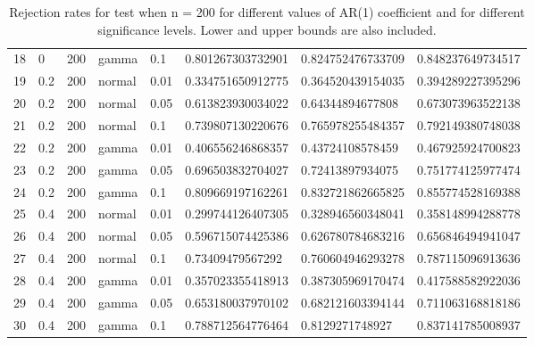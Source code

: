 \begin{table}[ht]
\begin{tabular}{rlllllll}
  18 & 0 & 200 & gamma & 0.1 & 0.801267303732901 & 0.824752476733709 & 0.848237649734517 \\ 
  19 & 0.2 & 200 & normal & 0.01 & 0.334751650912775 & 0.364520439154035 & 0.394289227395296 \\ 
  20 & 0.2 & 200 & normal & 0.05 & 0.613823930034022 & 0.64344894677808 & 0.673073963522138 \\ 
  21 & 0.2 & 200 & normal & 0.1 & 0.739807130220676 & 0.765978255484357 & 0.792149380748038 \\ 
  22 & 0.2 & 200 & gamma & 0.01 & 0.406556246868357 & 0.43724108578459 & 0.467925924700823 \\ 
  23 & 0.2 & 200 & gamma & 0.05 & 0.696503832704027 & 0.72413897934075 & 0.751774125977474 \\ 
  24 & 0.2 & 200 & gamma & 0.1 & 0.809669197162261 & 0.832721862665825 & 0.855774528169388 \\ 
  25 & 0.4 & 200 & normal & 0.01 & 0.299744126407305 & 0.328946560348041 & 0.358148994288778 \\ 
  26 & 0.4 & 200 & normal & 0.05 & 0.596715074425386 & 0.626780784683216 & 0.656846494941047 \\ 
  27 & 0.4 & 200 & normal & 0.1 & 0.73409479567292 & 0.760604946293278 & 0.787115096913636 \\ 
  28 & 0.4 & 200 & gamma & 0.01 & 0.357023355418913 & 0.387305969170474 & 0.417588582922036 \\ 
  29 & 0.4 & 200 & gamma & 0.05 & 0.653180037970102 & 0.682121603394144 & 0.711063168818186 \\ 
  30 & 0.4 & 200 & gamma & 0.1 & 0.788712564776464 & 0.8129271748927 & 0.837141785008937 \\ 
   \hline
\end{tabular}
\caption{Rejection rates for test when n = 200 for 
                   different values of AR(1) coefficient and for different 
                   significance levels. Lower and upper bounds are also 
                   included.} 
\label{rr_200}
\end{table}

